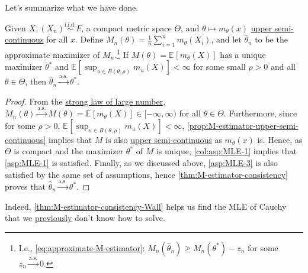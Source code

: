 Let's summarize what we have done.

\begin{theorem}[Wall]\label{thm:M-estimator-consistency-Wall}
	Given \(X, (X_n) \overset{\text{i.i.d.} }{\sim } F\), a compact metric space \(\Theta \), and \(\theta \mapsto m_\theta (x)\) \hyperref[def:upper-semi-continuous]{upper semi-continuous} for all \(x\). Define \(M_n (\theta ) = \frac{1}{n}\sum_{i=1}^{n} m_\theta (X_i)\), and let \(\hat{\theta} _n\) to be the approximate maximizer of \(M_n\).\footnote{I.e., \autoref{eq:approximate-M-estimator}: \(M_n(\hat{\theta} _n) \geq M_n(\theta ^{\ast} ) - z_n\) for some \(z_n \overset{\text{a.s.} }{\to} 0\).} If \(M(\theta ) = \mathbb{E}_{}[m_\theta (X)] \) has a unique maximizer \(\theta ^{\ast} \) and \(\mathbb{E}_{}[\sup _{u \in B(\theta , \rho )} m_u (X) ] < \infty\) for some small \(\rho > 0\) and all \(\theta \in \Theta \), then \(\hat{\theta} _n \overset{\text{a.s.} }{\to} \theta ^{\ast} \).
\end{theorem}
\begin{proof}
	From the \hyperref[thm:SLLN]{strong law of large number}, \(M_n(\theta ) \overset{\text{a.s.} }{\to} M(\theta ) = \mathbb{E}_{}[m_\theta (X) ] \in [-\infty , \infty )\) for all \(\theta \in \Theta \). Furthermore, since for some \(\rho > 0\), \(\mathbb{E}_{}[\sup _{u \in B(\theta , \rho )} m_u(X)] < \infty \), \autoref{prop:M-estimator-upper-semi-continuous} implies that \(M\) is also \hyperref[def:upper-semi-continuous]{upper semi-continuous} as \(m_\theta (x)\) is. Hence, as \(\Theta \) is compact and the maximizer \(\theta ^{\ast} \) of \(M\) is unique, \autoref{col:asp:MLE-1} implies that \autoref{asp:MLE-1} is satisfied. Finally, as we discussed above, \autoref{asp:MLE-3} is also satisfied by the same set of assumptions, hence \autoref{thm:M-estimator-consistency} proves that \(\hat{\theta} _n \overset{\text{a.s.} }{\to} \theta ^{\ast} \).
\end{proof}

Indeed, \autoref{thm:M-estimator-consistency-Wall} helps us find the MLE of Cauchy that we \hyperref[eg:MLE-Cauchy]{previously} don't know how to solve.

